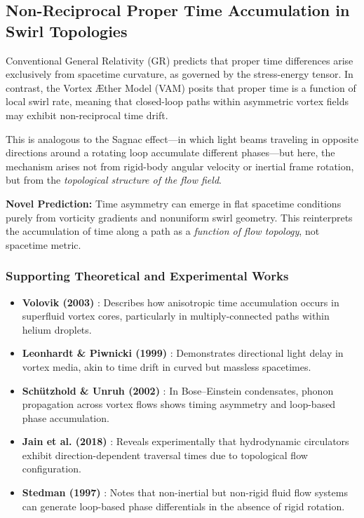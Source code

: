 \documentclass[a4paper, aps,preprint,superscriptaddress, 12pt]{revtex4}
\begin{document}
\subsection{Non-Reciprocal Proper Time Accumulation in Swirl Topologies}

Conventional General Relativity (GR) predicts that proper time differences arise exclusively from spacetime curvature, as governed by the stress-energy tensor. In contrast, the Vortex Æther Model (VAM) posits that proper time is a function of local swirl rate, meaning that closed-loop paths within asymmetric vortex fields may exhibit non-reciprocal time drift.

This is analogous to the Sagnac effect---in which light beams traveling in opposite directions around a rotating loop accumulate different phases---but here, the mechanism arises not from rigid-body angular velocity or inertial frame rotation, but from the \emph{topological structure of the flow field}.

\textbf{Novel Prediction:} Time asymmetry can emerge in flat spacetime conditions purely from vorticity gradients and nonuniform swirl geometry. This reinterprets the accumulation of time along a path as a \emph{function of flow topology}, not spacetime metric.

\subsubsection{Supporting Theoretical and Experimental Works}

\begin{itemize}
    \item \textbf{Volovik (2003)} \cite{volovik2003}: Describes how anisotropic time accumulation occurs in superfluid vortex cores, particularly in multiply-connected paths within helium droplets.

    \item \textbf{Leonhardt \& Piwnicki (1999)} \cite{leonhardt1999}: Demonstrates directional light delay in vortex media, akin to time drift in curved but massless spacetimes.

    \item \textbf{Schützhold \& Unruh (2002)} \cite{schutzhold2002}: In Bose–Einstein condensates, phonon propagation across vortex flows shows timing asymmetry and loop-based phase accumulation.

    \item \textbf{Jain et al. (2018)} \cite{jain2018}: Reveals experimentally that hydrodynamic circulators exhibit direction-dependent traversal times due to topological flow configuration.

    \item \textbf{Stedman (1997)} \cite{stedman1997}: Notes that non-inertial but non-rigid fluid flow systems can generate loop-based phase differentials in the absence of rigid rotation.
\end{itemize}
\end{document}
